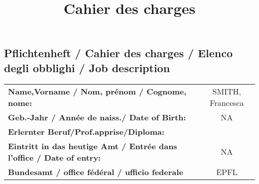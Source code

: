 \documentclass[
]{article}
\title{Cahier des charges}
\author{}
\date{\vspace{-2.5em}}
\begin{document}
\maketitle

\hypertarget{pflichtenheft-cahier-des-charges-elenco-degli-obblighi-job-description}{%
\subsection{Pflichtenheft / Cahier des charges / Elenco degli obblighi /
Job
description}\label{pflichtenheft-cahier-des-charges-elenco-degli-obblighi-job-description}}

\begin{longtable}[]{@{}lc@{}}
\toprule
\endhead
\begin{minipage}[t]{0.44\columnwidth}\raggedright
\textbf{Name,Vorname / Nom, prénom / Cognome, nome:}\strut
\end{minipage} & \begin{minipage}[t]{0.50\columnwidth}\centering
SMITH, Francesca\strut
\end{minipage}\tabularnewline
\begin{minipage}[t]{0.44\columnwidth}\raggedright
\textbf{Geb.-Jahr / Année de naiss./ Date of Birth:}\strut
\end{minipage} & \begin{minipage}[t]{0.50\columnwidth}\centering
NA\strut
\end{minipage}\tabularnewline
\begin{minipage}[t]{0.44\columnwidth}\raggedright
\textbf{Erlernter Beruf/Prof.apprise/Diploma:}\strut
\end{minipage} & \begin{minipage}[t]{0.50\columnwidth}\centering
0\strut
\end{minipage}\tabularnewline
\begin{minipage}[t]{0.44\columnwidth}\raggedright
\textbf{Eintritt in das heutige Amt / Entrée dans l'office / Date of
entry:}\strut
\end{minipage} & \begin{minipage}[t]{0.50\columnwidth}\centering
NA\strut
\end{minipage}\tabularnewline
\begin{minipage}[t]{0.44\columnwidth}\raggedright
\textbf{Bundesamt / office fédéral / ufficio federale}\strut
\end{minipage} & \begin{minipage}[t]{0.50\columnwidth}\centering
EPFL\strut
\end{minipage}\tabularnewline

\end{longtable}
\end{document}
